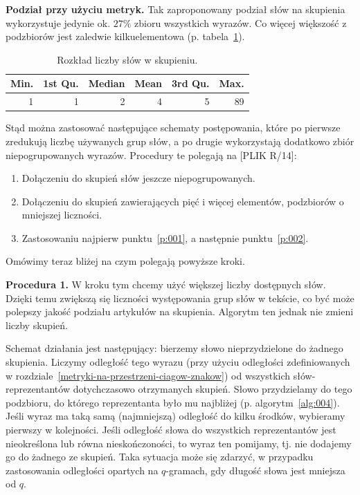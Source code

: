\documentclass{praca1}
\begin{document}
\textbf{Podział przy użyciu metryk.}
Tak zaproponowany podział słów na skupienia wykorzystuje jedynie ok. $27\%$ zbioru wszystkich wyrazów. Co więcej większość z podzbiorów jest zaledwie kilkuelementowa (p. tabela~\ref{tab:004}). 

\begin{table}[!h]
\centering
\begin{tabular}{|r|r|r|r|r|r|}
  \hline
Min. & 1st Qu. & Median & Mean & 3rd Qu. & Max. \\ 
  \hline
1 & 1 & 2 & 4 & 5 & 89 \\ 
   \hline
\end{tabular}
\caption{Rozkład liczby słów w skupieniu.}
\label{tab:004}
\end{table}


Stąd można zastosować następujące schematy postępowania, które po pierwsze zredukują liczbę używanych grup słów, a po drugie wykorzystają dodatkowo zbiór niepogrupowanych wyrazów. Procedury te polegają na [PLIK R/14]:
\begin{enumerate}
\item\label{p:001} Dołączeniu do skupień słów jeszcze niepogrupowanych.
\item\label{p:002} Dołączeniu do skupień zawierających pięć i więcej elementów, podzbiorów o mniejszej liczności.
\item Zastosowaniu najpierw punktu~\ref{p:001}, a następnie punktu~\ref{p:002}.
\end{enumerate}

Omówimy teraz bliżej na czym polegają powyższe kroki.

\textbf{Procedura 1.} W kroku tym chcemy użyć większej liczby dostępnych słów. Dzięki temu zwiększą się liczności występowania grup słów w tekście, co być może polepszy jakość podziału artykułów na skupienia. Algorytm ten jednak nie zmieni liczby skupień. 

Schemat działania jest następujący: bierzemy słowo nieprzydzielone do żadnego skupienia. Liczymy odległość tego wyrazu (przy użyciu odległości zdefiniowanych w rozdziale~\ref{metryki-na-przestrzeni-ciagow-znakow}) od wszystkich słów-reprezentantów dotychczasowo otrzymanych skupień. Słowo przydzielamy do tego podzbioru, do którego reprezentanta było mu najbliżej (p. algorytm~\ref{alg:004}). Jeśli wyraz ma taką samą (najmniejszą) odległość do kilku środków, wybieramy pierwszy w kolejności. Jeśli odległość słowa do wszystkich reprezentantów jest nieokreślona lub równa nieskończoności, to wyraz ten pomijamy, tj. nie dodajemy go do żadnego ze skupień. Taka sytuacja może się zdarzyć, w przypadku zastosowania odległości opartych na $q$-gramach, gdy długość słowa jest mniejsza od $q$.
\end{document}
